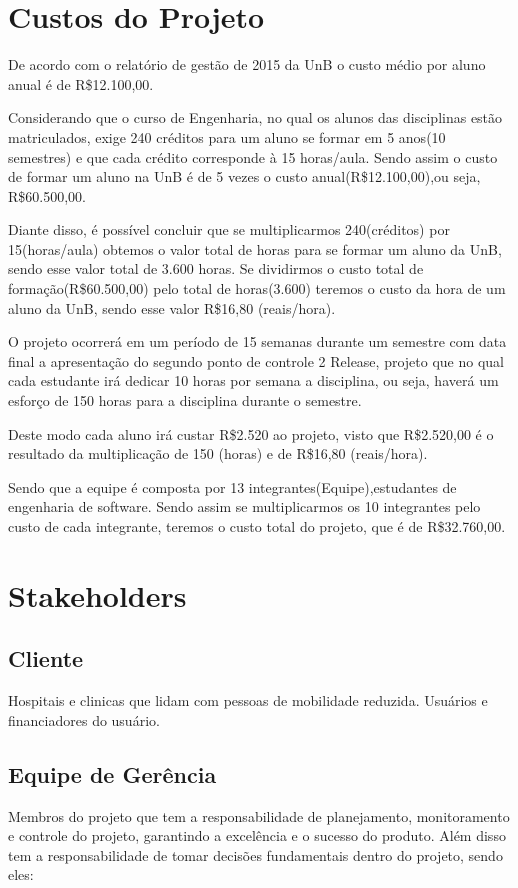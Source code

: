 \section{Custos do Projeto}
De acordo com o relatório de gestão de 2015 da UnB o custo médio por aluno 
anual é de R\$12.100,00.

Considerando que o curso de Engenharia, no qual os alunos das 
disciplinas estão matriculados, exige 240 créditos para um aluno se formar em 
5 anos(10 semestres) e que cada crédito corresponde à 15 
horas/aula. Sendo assim o custo de formar um aluno na UnB é de 5 
vezes o custo anual(R\$12.100,00),ou seja, R\$60.500,00.

Diante disso, é possível concluir que se multiplicarmos 240(créditos) por 
15(horas/aula) obtemos o valor total de horas para se formar um aluno da UnB,
sendo esse valor total de 3.600 horas. Se dividirmos o custo total de 
formação(R\$60.500,00) pelo total de horas(3.600) teremos o custo da hora 
de um aluno da UnB, sendo esse valor R\$16,80 (reais/hora).

O projeto ocorrerá em um período de 15 semanas durante um semestre com data 
final a apresentação do segundo ponto de controle 2 Release, projeto que no qual cada estudante irá 
dedicar 10 horas por semana a disciplina, ou seja, haverá um esforço de 150 
horas para a disciplina durante o semestre.

Deste modo cada aluno irá custar R\$2.520 ao projeto, visto que R\$2.520,00 é o 
resultado da multiplicação de 150 (horas) e de R\$16,80 (reais/hora).

Sendo que a equipe é composta por 13 integrantes(Equipe),estudantes de 
engenharia de software. Sendo assim se multiplicarmos os 10 integrantes pelo 
custo de cada integrante, teremos o custo total do projeto, que é de 
R\$32.760,00.

\section{Stakeholders}

\subsection{Cliente}
Hospitais e clinicas que lidam com pessoas de mobilidade reduzida. Usuários e financiadores do usuário.

\subsection{Equipe de Gerência}
Membros do projeto que tem a responsabilidade de planejamento, monitoramento 
e controle do projeto, garantindo a excelência e o sucesso do produto. Além 
disso tem a responsabilidade de tomar decisões fundamentais dentro do projeto, 
sendo eles:

